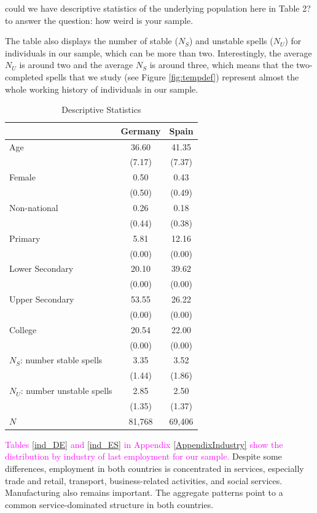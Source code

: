 \documentclass[12pt]{article}
\theoremstyle{definition}
\theoremstyle{remark}
\begin{document}
\textcolor{mygreen}{could we have descriptive statistics of the underlying population here in Table 2? to answer the question: how weird is your sample.}

The table also displays the number of stable ($N_{S}$) and unstable spells  ($N_{U}$) for individuals in our sample, which can be more than two. 
Interestingly, the average $N_{U}$ is around two and the average $N_{S}$ is around three, which means that the two-completed spells that we study (see Figure \ref{fig:tempdef}) represent almost the whole working history of individuals in our sample.

\begin{table}[h!]
    \centering
    \caption{Descriptive Statistics}
\begin{tabular}{lcc}
\toprule
 & Germany & Spain \\
\midrule
Age & 36.60 & 41.35 \\
    & (7.17) & (7.37) \\
Female & 0.50 & 0.43 \\
    & (0.50) & (0.49) \\
Non-national & 0.26 & 0.18 \\
    & (0.44) & (0.38) \\
Primary & 5.81 & 12.16 \\
    & (0.00) & (0.00) \\
Lower Secondary & 20.10 & 39.62 \\
    & (0.00) & (0.00) \\
Upper Secondary & 53.55 & 26.22 \\
    & (0.00) & (0.00) \\
College & 20.54 & 22.00 \\
    & (0.00) & (0.00) \\
\midrule
$N_S$: number stable spells & 3.35 & 3.52 \\
   & (1.44) & (1.86) \\
$N_U$: number unstable spells & 2.85 & 2.50 \\
   & (1.35) & (1.37) \\
\hline \hline
$N$ & 81,768 & 69,406 \\
\bottomrule
\end{tabular}
 \label{tab:desstats_2+spell}
\end{table}

\textcolor{magenta}{Tables \ref{ind_DE} and \ref{ind_ES} in Appendix \ref{AppendixIndustry} show the distribution by industry of last employment for our sample.}
Despite some differences, employment in both countries is concentrated in services, especially trade and retail, transport, business-related activities, and social services. Manufacturing also remains important. The aggregate patterns point to a common service-dominated structure in both countries.
\end{document}
